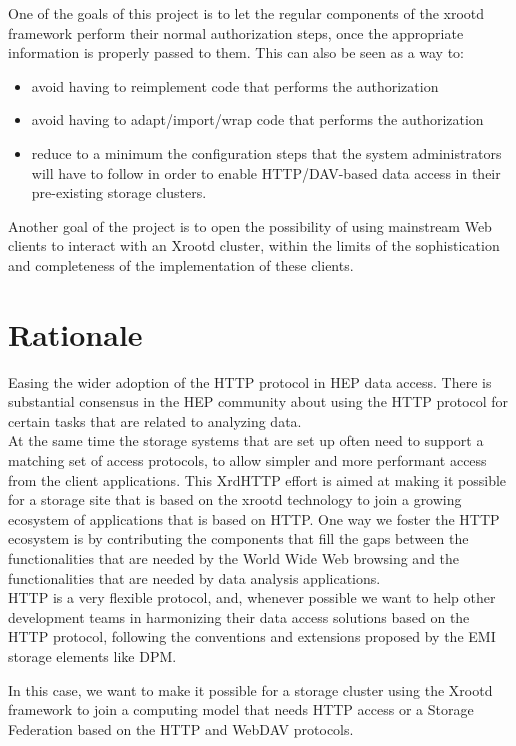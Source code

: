 \documentclass[12pt]{article} %
\begin{document}
 One of the goals of this project is to let the regular components of the xrootd framework perform their normal authorization steps, once the appropriate information is properly passed to them. This can also be seen as a way to:

\begin{itemize}
 \item avoid having to reimplement code that performs the authorization
 \item avoid having to adapt/import/wrap code that performs the authorization
 \item reduce to a minimum the configuration steps that the system administrators will have to follow in order to enable HTTP/DAV-based data access in their pre-existing storage clusters.
\end{itemize}

 Another goal of the project is to open the possibility of using mainstream Web clients to interact with an Xrootd cluster, within the limits of the sophistication and completeness of the implementation of these clients.

\section{Rationale}

Easing the wider adoption of the HTTP protocol in HEP data access. There is substantial consensus in the HEP community about using the HTTP protocol for certain tasks that are related to analyzing data.\\
At the same time the storage systems that are set up often need to support a matching set of access protocols, to allow simpler and more performant access from the client applications. This XrdHTTP effort is aimed at making it possible for a storage site that is based on the xrootd technology to join a growing ecosystem of applications that is based on HTTP. One way we foster the HTTP ecosystem is by contributing the components that fill the gaps between the functionalities that are needed by the World Wide Web browsing and the functionalities that are needed by data analysis applications.\\
HTTP is a very flexible protocol, and, whenever possible we want to help other development teams in harmonizing their data access solutions based on the HTTP protocol, following the conventions and extensions proposed by the EMI storage elements like DPM.

In this case, we want to make it possible for a storage cluster using the Xrootd framework to join a computing model that needs HTTP access or a Storage Federation based on the HTTP and WebDAV protocols.
\end{document}
